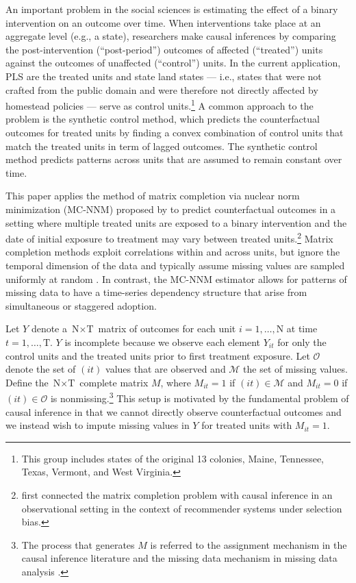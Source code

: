 \documentclass[hidelinks,12pt]{article}
\begin{document}
An important problem in the social sciences is estimating the effect of a binary intervention on an outcome over time. When interventions take place at an aggregate level (e.g., a state), researchers make causal inferences by comparing the post-intervention (``post-period'') outcomes of affected (``treated'') units against the outcomes of unaffected  (``control'') units. In the current application, PLS are the treated units and state land states --- i.e., states that were not crafted from the public domain and were therefore not directly affected by homestead policies --- serve as control units.\footnote{This group includes states of the original 13 colonies, Maine, Tennessee, Texas, Vermont, and West Virginia.} A common approach to the problem is the synthetic control method, which predicts the counterfactual outcomes for treated units by finding a convex combination of control units that match the treated units in term of lagged outcomes. The synthetic control method predicts patterns across units that are assumed to remain constant over time. 

This paper applies the  method of matrix completion via nuclear norm minimization (MC-NNM) proposed by \citet{athey2017matrix} to predict counterfactual outcomes in a setting where multiple treated units are exposed to a binary intervention and the date of initial exposure to treatment may vary between treated units.\footnote{\citet{schnabel2016recommendations} first connected the matrix completion problem with causal inference in an observational setting in the context of recommender systems under selection bias.} Matrix completion methods \citep[e.g.,][]{mazumder2010spectral} exploit correlations within and across units, but ignore the temporal dimension of the data and typically assume missing values are sampled uniformly at random \citep{yoon2018estimating}. In contrast, the MC-NNM estimator allows for patterns of missing data to have a time-series dependency structure that arise from simultaneous or staggered adoption.

Let $Y$ denote a $\text{N} \times \text{T}$ matrix of outcomes for each unit $i =1, \ldots, \text{N}$ at time $t = 1, \ldots, \text{T}$. $Y$ is incomplete because we observe each element $Y_{it}$ for only the control units and the treated units prior to first treatment exposure. Let $\mathcal{O}$ denote the set of $(it)$ values that are observed and $\mathcal{M}$ the set of missing values. Define the $\text{N} \times \text{T}$ complete matrix $M$, where $M_{it} =1 $ if $(it) \in \mathcal{M}$ and $M_{it} = 0$ if $(it) \in \mathcal{O}$ is nonmissing.\footnote{The process that generates $M$ is referred to the assignment mechanism in the causal inference literature \citep{imbens2015causal} and the missing data mechanism in missing data analysis \citep{little2014}.} This setup is motivated by the fundamental problem of causal inference \citep{holland1986statistics} in that we cannot directly observe counterfactual outcomes and we instead wish to impute missing values in $Y$ for treated units with $M_{it}=1$. 
\end{document}
